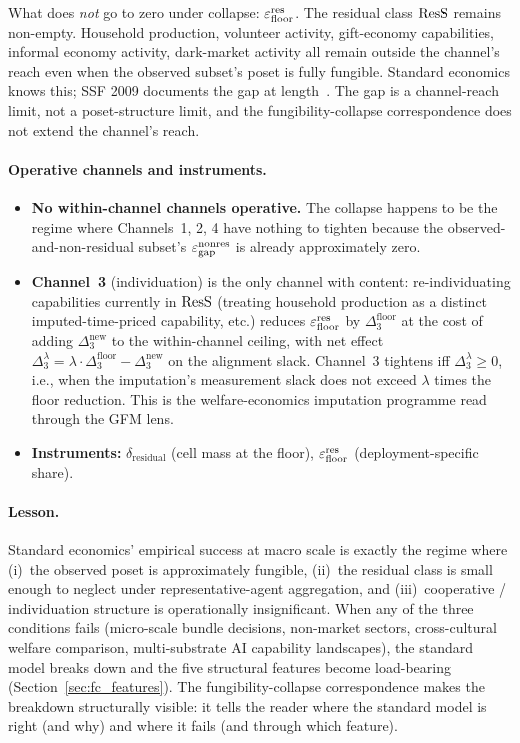 What does \emph{not} go to zero under collapse: $\varepsilon_{\mathrm{floor}}^{\mathrm{res}}$.
The residual class $\mathrm{ResS}$ remains non-empty.  Household
production, volunteer activity, gift-economy capabilities,
informal economy activity, dark-market activity all remain
outside the channel's reach even when the observed subset's
poset is fully fungible.  Standard economics knows this; SSF
2009 documents the gap at length~\citep{stiglitz2009report}.
The gap is a channel-reach limit, not a poset-structure limit,
and the fungibility-collapse correspondence does not extend
the channel's reach.

\paragraph{Operative channels and instruments.}
\begin{itemize}
\item \textbf{No within-channel channels operative.}  The
  collapse happens to be the regime where Channels~1, 2, 4
  have nothing to tighten because the observed-and-non-residual
  subset's $\varepsilon_{\mathrm{gap}}^{\mathrm{nonres}}$ is already approximately zero.
\item \textbf{Channel~3} (individuation) is the only channel
  with content: re-individuating capabilities currently in
  $\mathrm{ResS}$ (treating household production as a distinct
  imputed-time-priced capability, etc.) reduces $\varepsilon_{\mathrm{floor}}^{\mathrm{res}}$ by
  $\Delta_3^{\mathrm{floor}}$ at the cost of adding
  $\Delta_3^{\mathrm{new}}$ to the within-channel ceiling, with
  net effect $\Delta_3^{\lambda} = \lambda \cdot
  \Delta_3^{\mathrm{floor}} - \Delta_3^{\mathrm{new}}$ on the
  alignment slack.  Channel~3 tightens iff $\Delta_3^{\lambda}
  \geq 0$, i.e., when the imputation's measurement slack does
  not exceed $\lambda$ times the floor reduction.  This is the
  welfare-economics imputation programme
  \citep{stiglitz2009report,aguiar2007measuring} read through
  the GFM lens.
\item \textbf{Instruments:}
  $\delta_{\mathrm{residual}}$ (cell mass at the floor),
  $\varepsilon_{\mathrm{floor}}^{\mathrm{res}}$ (deployment-specific share).
\end{itemize}

\paragraph{Lesson.}
Standard economics' empirical success at macro scale is
exactly the regime where (i)~the observed poset is
approximately fungible, (ii)~the residual class is small
enough to neglect under representative-agent aggregation, and
(iii)~cooperative / individuation structure is operationally
insignificant.  When any of the three conditions
fails (micro-scale bundle decisions, non-market sectors,
cross-cultural welfare comparison, multi-substrate AI
capability landscapes), the standard model breaks down and the
five structural features become load-bearing
(Section~\ref{sec:fc_features}).  The fungibility-collapse
correspondence makes the breakdown structurally visible: it
tells the reader where the standard model is right (and why)
and where it fails (and through which feature).

